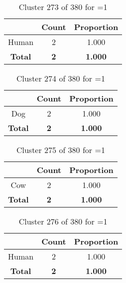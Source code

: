 \begin{table}[ht!]
\centering
\begin{tabular}{|c|c|c|}
\hline
\bf \Spec{} &\bf Count &\bf Proportion\\ \hline \hline
Human & 2 & 1.000\\ \hline
\hline
\bf Total & \bf 2 & \bf 1.000\\ \hline
\end{tabular}
\label{tab:cluster:273:1}
\caption{Cluster 273 of 380 for \minneigh{}=1}
\end{table}

\begin{table}[ht!]
\centering
\begin{tabular}{|c|c|c|}
\hline
\bf \Spec{} &\bf Count &\bf Proportion\\ \hline \hline
Dog & 2 & 1.000\\ \hline
\hline
\bf Total & \bf 2 & \bf 1.000\\ \hline
\end{tabular}
\label{tab:cluster:274:1}
\caption{Cluster 274 of 380 for \minneigh{}=1}
\end{table}

\begin{table}[ht!]
\centering
\begin{tabular}{|c|c|c|}
\hline
\bf \Spec{} &\bf Count &\bf Proportion\\ \hline \hline
Cow & 2 & 1.000\\ \hline
\hline
\bf Total & \bf 2 & \bf 1.000\\ \hline
\end{tabular}
\label{tab:cluster:275:1}
\caption{Cluster 275 of 380 for \minneigh{}=1}
\end{table}

\begin{table}[ht!]
\centering
\begin{tabular}{|c|c|c|}
\hline
\bf \Spec{} &\bf Count &\bf Proportion\\ \hline \hline
Human & 2 & 1.000\\ \hline
\hline
\bf Total & \bf 2 & \bf 1.000\\ \hline
\end{tabular}
\label{tab:cluster:276:1}
\caption{Cluster 276 of 380 for \minneigh{}=1}
\end{table}

